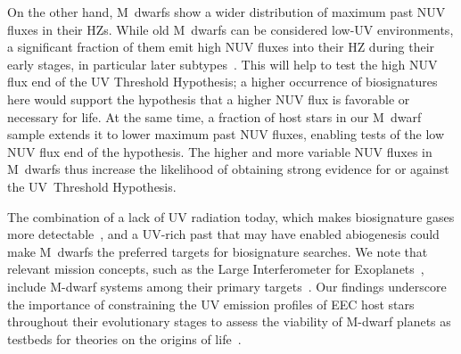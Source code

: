 \documentclass[twocolumn,twocolappendix,linenumbers]{aastex631}
\begin{document}
On the other hand, M~dwarfs show a wider distribution of maximum past \gls{NUV} fluxes in their \glspl{HZ}.
While old M~dwarfs can be considered low-UV environments, a significant fraction of them emit high \gls{NUV} fluxes into their \gls{HZ} during their early stages, in particular later subtypes~\citep{Richey-Yowell2023}.
This will help to test the high \gls{NUV} flux end of the UV Threshold Hypothesis; a higher occurrence of biosignatures here would support the hypothesis that a higher \gls{NUV} flux is favorable or necessary for life.
At the same time, a fraction of host stars in our M~dwarf sample extends it to lower maximum past \gls{NUV} fluxes, enabling tests of the low \gls{NUV} flux end of the hypothesis.
The higher and more variable \gls{NUV} fluxes in M~dwarfs thus increase the likelihood of obtaining strong evidence for or against the UV~Threshold Hypothesis.

The combination of a lack of \gls{UV} radiation today, which makes biosignature gases more detectable~\citep{Segura2005}, and a UV-rich past that may have enabled abiogenesis could make M~dwarfs the preferred targets for biosignature searches.
We note that relevant mission concepts, such as the Large Interferometer for Exoplanets~\citep[\life,][]{Quanz2022,Glauser2024}, include M-dwarf systems among their primary targets~\citep{Kammerer2018,Carrion-Gonzalez2023}.
Our findings underscore the importance of constraining the \gls{UV} emission profiles of \gls{EEC} host stars throughout their evolutionary stages to assess the viability of M-dwarf planets as testbeds for theories on the origins of life~\citep{Rimmer2021,Ranjan2023a}.
\end{document}
